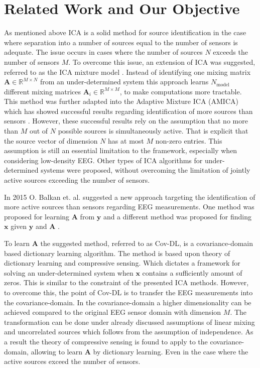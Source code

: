 \section{Related Work and Our Objective}\label{sec:relatedwork}
As mentioned above ICA is a solid method for source identification in the case where separation into a number of sources equal to the number of sensors is adequate. The issue occurs in cases where the number of sources $N$ exceeds the number of sensors $M$. 
To overcome this issue, an extension of ICA was suggested, referred to as the ICA mixture model \cite{Balkan2015}.
Instead of identifying one mixing matrix $\mathbf{A} \in \mathbb{R}^{M \times N}$ from an under-determined system this approach learns $N_{\text{model}}$ different mixing matrices $\mathbf{A}_i \in \mathbb{R}^{M\times M}$, to make computations more tractable. 
This method was further adapted into the Adaptive Mixture ICA (AMICA) which has showed successful results regarding identification of more sources than sensors \cite{Palmer2008}. 
However, these successful results rely on the assumption that no more than $M$ out of $N$ possible sources is simultaneously active. That is explicit that the source vector of dimension $N$ has at most $M$ non-zero entries.
This assumption is still an essential limitation to the framework, especially when considering low-density EEG. 
Other types of ICA algorithms for under-determined systems were proposed, without overcoming the limitation of jointly active sources exceeding the number of sensors.

In 2015 O. Balkan et. al. suggested a new approach targeting the identification of more active sources than sensors regarding EEG measurements. One method was proposed for learning $\mathbf{A}$ from $\mathbf{y}$ \cite{Balkan2015} and a different method was proposed for finding $\mathbf{x}$ given $\mathbf{y}$ and $\mathbf{A}$ \cite{Balkan2014}.

To learn $\mathbf{A}$ the suggested method, referred to as Cov-DL, is a covariance-domain based dictionary learning algorithm. 
The method is based upon theory of dictionary learning and compressive sensing. Which dictates a framework for solving an under-determined system when $\mathbf{x}$ contains a sufficiently amount of zeros. 
This is similar to the constraint of the presented ICA methods. However, to overcome this, the point of Cov-DL is to transfer the EEG measurements into the covariance-domain. In the covariance-domain a higher dimensionality can be achieved compared to the original EEG sensor domain with dimension $M$.
The transformation can be done under already discussed assumptions of linear mixing and uncorrelated sources which follows from the assumption of independence.
As a result the theory of compressive sensing is found to apply to the covariance-domain, allowing to learn $\mathbf{A}$ by dictionary learning. Even in the case where the active sources exceed the number of sensors.

